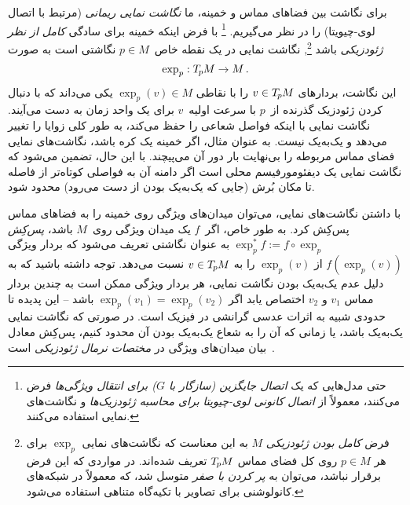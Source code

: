 برای نگاشت بین فضاهای مماس و خمینه، ما \emph{نگاشت نمایی ریمانی} (مرتبط با اتصال لوی-چیویتا) را در نظر می‌گیریم.%
\footnote{
	حتی مدل‌هایی که یک \emph{اتصال جایگزین (سازگار با $G$) برای انتقال ویژگی‌ها} فرض می‌کنند، معمولاً از \emph{اتصال کانونی لوی-چیویتا برای محاسبه ژئودزیک‌ها} و نگاشت‌های نمایی استفاده می‌کنند.
}
با فرض اینکه خمینه برای سادگی \emph{کامل از نظر ژئودزیکی} باشد%
\footnote{
	فرض \emph{کامل بودن ژئودزیکی} $M$ به این معناست که نگاشت‌های نمایی $\exp_p$ برای هر $p \in M$ روی کل فضای مماس $T_{\mkern-1.5mu p}\mkern-.5muM$ تعریف شده‌اند.
	در مواردی که این فرض برقرار نباشد، می‌توان به \emph{پر کردن با صفر} متوسل شد، که معمولاً در شبکه‌های کانولوشنی برای تصاویر با تکیه‌گاه متناهی استفاده می‌شود.
},
نگاشت نمایی در یک نقطه خاص~$p\in M$ نگاشتی است به صورت
\begin{align}
	\exp_p: T_{\mkern-1.5mu p}\mkern-.5muM \to M \,.
\end{align}
این نگاشت، بردارهای $v\in T_{\mkern-1.5mu p}\mkern-.5muM$ را با نقاطی $\exp_p(v) \in M$ یکی می‌داند که با دنبال کردن ژئودزیک گذرنده از~$p$ با سرعت اولیه~$v$ برای یک واحد زمان به دست می‌آیند.
نگاشت نمایی با اینکه فواصل شعاعی را حفظ می‌کند، به طور کلی زوایا را تغییر می‌دهد و یک‌به‌یک نیست.
به عنوان مثال، اگر خمینه یک کره باشد، نگاشت‌های نمایی فضای مماس مربوطه را بی‌نهایت بار دور آن می‌پیچند.
با این حال، تضمین می‌شود که نگاشت نمایی یک دیفئومورفیسم محلی است اگر دامنه آن به فواصلی کوتاه‌تر از فاصله تا مکان بُرش (جایی که یک‌به‌یک بودن از دست می‌رود) محدود شود.


با داشتن نگاشت‌های نمایی، می‌توان میدان‌های ویژگی روی خمینه را به فضاهای مماس پس‌کِش کرد.
به طور خاص، اگر~$f$ یک میدان ویژگی روی~$M$ باشد، \emph{پس‌کِش} $\exp_p^*f := f \circ \exp_p$ به عنوان نگاشتی تعریف می‌شود که بردار ویژگی $f(\exp_p(v))$ از $\exp_p(v)$ را به $v\in T_{\mkern-1.5mu p}\mkern-.5muM$ نسبت می‌دهد.
توجه داشته باشید که به دلیل عدم یک‌به‌یک بودن نگاشت نمایی، هر بردار ویژگی ممکن است به چندین بردار مماس $v_1$ و $v_2$ اختصاص یابد اگر $\exp_p(v_1) = \exp_p(v_2)$ باشد -- این پدیده تا حدودی شبیه به اثرات عدسی گرانشی در فیزیک است.
در صورتی که نگاشت نمایی یک‌به‌یک باشد، یا زمانی که آن را به شعاع یک‌به‌یک بودن آن محدود کنیم، پس‌کِش معادل بیان میدان‌های ویژگی در \emph{مختصات نرمال ژئودزیکی} است~\cite{masci2015geodesic}.


